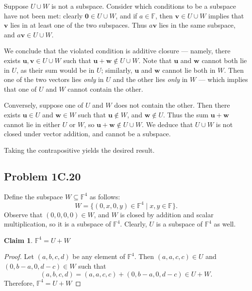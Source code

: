 \documentclass[11pt]{article}
\newtheorem*{claim*}{Claim}
\renewcommand{\vec}[1]{\mathbf{#1}}
\begin{document}
Suppose $U \cup W$ is not a subspace. Consider which conditions to be a subspace have not been met: clearly $\vec{0} \in U \cup W$, and if $a \in \mathbb{F}$, then $\vec{v} \in U \cup W$ implies that $\vec{v}$ lies in at least one of the two subspaces. Thus $a \vec{v}$ lies in the same subspace, and $a \vec{v} \in U \cup W$.

We conclude that the violated condition is additive closure --- namely, there exists $\vec{u}, \vec{v} \in U \cup W$ such that $\vec{u} + \vec{w} \notin U \cup W$. Note that $\vec{u}$ and $\vec{w}$ cannot both lie in $U$, as their sum would be in $U$; similarly, $\vec{u}$ and $\vec{w}$ cannot lie both in $W$. Then one of the two vectors lies \textit{only} in $U$ and the other lies \textit{only} in $W$ --- which implies that one of $U$ and $W$ cannot contain the other.

Conversely, suppose one of $U$ and $W$ does not contain the other. Then there exists $\vec{u} \in U$ and $\vec{w} \in W$ such that $\vec{u} \notin W$, and $\vec{w} \notin U$. Thus the sum $\vec{u} + \vec{w}$ cannot lie in either $U$ or $W$, so $\vec{u} + \vec{w} \notin U \cup W$. We deduce that $U \cup W$ is not closed under vector addition, and cannot be a subspace.

Taking the contrapositive yields the desired result.

\subsection{Problem 1C.20}

Define the subspace $W \subseteq \mathbb{F}^{4}$ as follows:
\[
	W = \{ (0, x, 0, y) \in \mathbb{F}^{4} \mid x, y \in \mathbb{F} \}.
\]
Observe that $(0, 0, 0, 0) \in W$, and $W$ is closed by addition and scalar multiplication, so it is a subspace of $\mathbb{F}^{4}$. Clearly, $U$ is a subspace of $\mathbb{F}^{4}$ as well.

\begin{adjustwidth}{1cm}{}
	\begin{claim*}
		$\mathbb{F}^{4} = U + W$
	\end{claim*}
    \begin{proof}\renewcommand{\qedsymbol}{}
		Let $(a, b, c, d)$ be any element of $\mathbb{F}^{4}$. Then $(a, a, c, c) \in U$ and $(0, b - a, 0, d - c) \in W$ such that 
		\[
			(a, b, c, d) = (a, a, c, c) + (0, b - a, 0, d - c) \in U + W.
		\]
		Therefore, $\mathbb{F}^{4} = U + W$ 
	\end{proof}
\end{adjustwidth}
\end{document}
